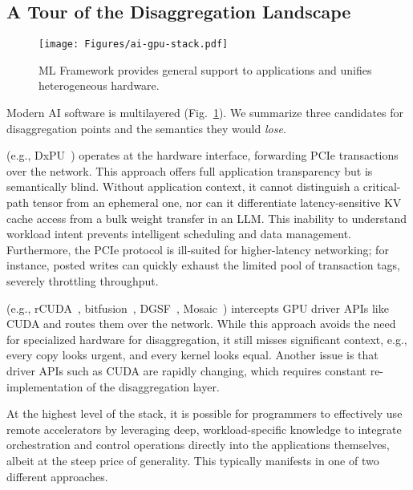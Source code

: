 \subsection{A Tour of the Disaggregation Landscape}
\label{sec:motiv:disagg-stack}

\begin{figure}
    \centering
    \texttt{[image: Figures/ai-gpu-stack.pdf]}
    \caption{ML Framework provides general support to applications and unifies heterogeneous hardware.
    }
    \label{fig:sys-stack}
\end{figure}

Modern AI software is multilayered (Fig.~\ref{fig:sys-stack}).
We summarize three candidates for disaggregation points and the semantics they would \emph{lose}.

(e.g., DxPU~\cite{dxpu-2023}) operates at the hardware interface, forwarding PCIe transactions over the network. This approach offers full application transparency but is semantically blind.
Without application context, it cannot distinguish a critical-path tensor from an ephemeral one, nor can it differentiate latency-sensitive KV cache access from a bulk weight transfer in an LLM.
This inability to understand workload intent prevents intelligent scheduling and data management. 
Furthermore, the PCIe protocol is ill-suited for higher-latency networking;
for instance, posted writes can quickly exhaust the limited pool of transaction tags, severely throttling throughput.


(e.g., rCUDA~\cite{rcuda}, bitfusion~\cite{vmware-bitfusion-eol-2025}, DGSF~\cite{dgsf}, Mosaic~\cite{mosaic}) intercepts GPU driver APIs like CUDA and routes them over the network.
While this approach avoids the need for specialized hardware for disaggregation,
it still misses significant context, e.g., every copy looks urgent, and every kernel looks equal.
Another issue is that driver APIs such as CUDA are rapidly changing, which requires constant re-implementation of the disaggregation layer.

At the highest level of the stack, it is possible for programmers to effectively use remote accelerators by leveraging deep, workload-specific knowledge to integrate orchestration and control operations directly into the applications themselves, albeit at the steep price of generality.
This typically manifests in one of two different approaches.

